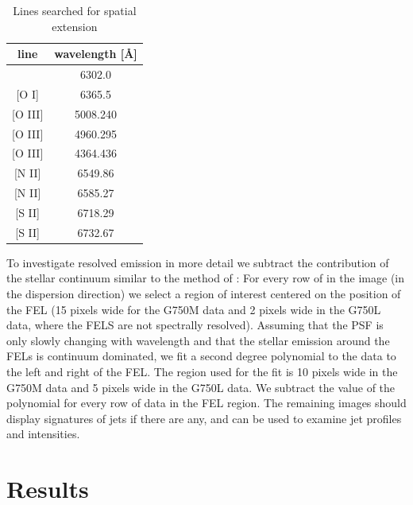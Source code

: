 \documentclass[twocolumn,trackchanges]{aastex63}
\begin{document}
\begin{table}
\caption{{Lines searched for spatial extension\label{tab:searchedlines}}}
\begin{center}
\begin{tabular}{cc}
\hline\hline
line & wavelength [\AA] \\
\hline
[O I] & 6302.0\\{}
[O I] & 6365.5\\{}
[O III] & 5008.240\\{}
[O III] & 4960.295\\{}
[O III] & 4364.436\\{}
[N II] & 6549.86\\{}
[N II] & 6585.27\\{}
[S II] & 6718.29\\{}
[S II] & 6732.67\\
\hline
\end{tabular}
\end{center}
\end{table}


To investigate resolved emission in more detail we subtract the contribution of
the stellar continuum similar to the method of \citet{2013A&A...550L...1S}: For
every row of in the image (in the dispersion direction) we select a region of
interest centered on the position of the FEL (15 pixels wide for the G750M data
and 2 pixels wide in the G750L data, where the FELS are not spectrally
resolved). Assuming that the PSF is only slowly changing with wavelength and
that the stellar emission around the FELs is continuum dominated, we fit a
second degree polynomial to the data to the left and right of the FEL. The
region used for the fit is 10 pixels wide in the G750M data and 5 pixels wide
in the G750L data. We subtract the value of the polynomial for every row of
data in the FEL region. The remaining images should display signatures of jets
if there are any, and can be used to examine jet profiles and intensities. 

\section{Results}
\label{sect:results}
\end{document}
